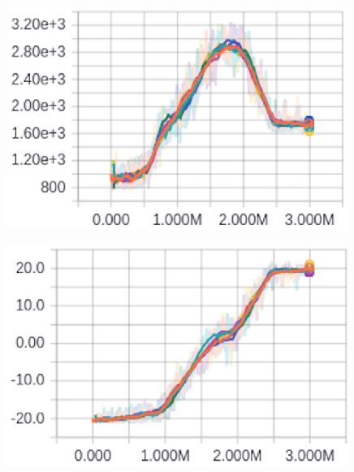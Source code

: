 \begin{figure}[ht]
    
    \begin{minipage}[b]{0.49\textwidth}
    \centering
    \includegraphics[width=0.99\textwidth]{pictures/20_length.eps}
    \label{fig:length20}
    \end{minipage}
    \begin{minipage}[b]{0.49\textwidth}
    \centering
    \includegraphics[width=0.99\textwidth]{pictures/20_reward.eps}
    \label{fig:reward20}
    \end{minipage}
    

\end{figure}

